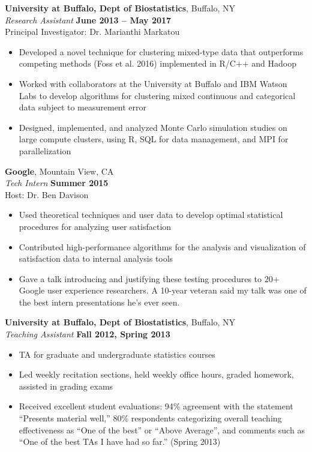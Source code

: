 \documentclass{article}
\begin{document}
 {\bf University at Buffalo, Dept of Biostatistics}, Buffalo, NY\\
 {\it Research Assistant} \hfill {\bf June 2013 -- May 2017} \\
 Principal Investigator: Dr. Marianthi Markatou 
 \begin{itemize} \itemsep -2pt
  \item Developed a novel technique for clustering mixed-type data that outperforms competing methods (Foss et al. 2016) implemented in R/C++ and Hadoop
  \item Worked with collaborators at the University at Buffalo and IBM Watson Labs to develop algorithms for clustering mixed continuous and categorical data subject to measurement error
  \item Designed, implemented, and analyzed Monte Carlo simulation studies on large compute clusters, using R, SQL for data management, and MPI for parallelization
 \end{itemize}

 {\bf Google}, Mountain View, CA\\
 {\it Tech Intern} \hfill {\bf Summer 2015} \\
 Host: Dr. Ben Davison
 \begin{itemize} \itemsep -2pt
  \item Used theoretical techniques and user data to develop optimal statistical procedures for analyzing user satisfaction
  \item Contributed high-performance algorithms for the analysis and visualization of satisfaction data to internal analysis tools
  \item Gave a talk introducing and justifying these testing procedures to 20+ Google user experience researchers. A 10-year veteran said my talk was one of the best intern presentations he's ever seen.
 \end{itemize}

 {\bf University at Buffalo, Dept of Biostatistics}, Buffalo, NY\\
 {\it Teaching Assistant} \hfill {\bf Fall 2012, Spring 2013}
 \begin{itemize} \itemsep -2pt
  \item TA for graduate and undergraduate statistics courses
  \item Led weekly recitation sections, held weekly office hours, graded homework, assisted in grading exams
  \item Received excellent student evaluations: 94\% agreement with the statement ``Presents material well,'' 80\% respondents categorizing overall teaching effectiveness as ``One of the best'' or ``Above Average'', and comments such as ``One of the best TAs I have had so far.'' (Spring 2013)
 \end{itemize}
 
\end{document}
